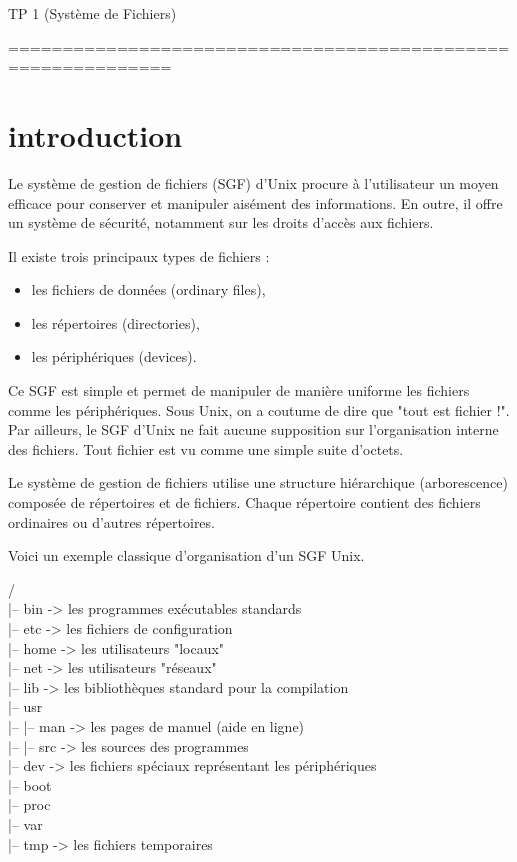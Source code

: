 \documentclass[10pt,a4paper]{article}
\begin{document}
\begin{center}
\huge{TP 1 (Système de Fichiers)}
\end{center}
=============================================================
\section{introduction}
Le système de gestion de fichiers (SGF) d'Unix procure à l'utilisateur un moyen efficace pour conserver et manipuler aisément des informations. En outre, il offre un système de sécurité, notamment sur les droits d'accès aux fichiers.


Il existe trois principaux types de fichiers :
\begin{itemize}
\item les fichiers de données (ordinary files),
\item les répertoires (directories),
\item les périphériques (devices).
\end{itemize}

Ce SGF est simple et permet de manipuler de manière uniforme les fichiers comme les périphériques. Sous Unix, on a coutume de dire que "tout est fichier !". Par ailleurs, le SGF d'Unix ne fait aucune
supposition sur l'organisation interne des fichiers. Tout fichier est vu comme une simple suite d'octets.


Le système de gestion de fichiers utilise une structure hiérarchique (arborescence) composée de répertoires et de fichiers. Chaque répertoire contient des fichiers ordinaires ou d'autres répertoires.

Voici un exemple classique d'organisation d'un SGF Unix.


/ \\
    |-- bin         -> les programmes exécutables standards \\
    |-- etc         -> les fichiers de configuration \\
    |-- home        -> les utilisateurs "locaux" \\
    |-- net         -> les utilisateurs "réseaux" \\
    |-- lib         -> les bibliothèques standard pour la compilation\\
    |-- usr         \\
    |-- |-- man     -> les pages de manuel (aide en ligne) \\
    |-- |-- src     -> les sources des programmes \\
    |-- dev         -> les fichiers spéciaux représentant les périphériques \\
    |-- boot        \\
    |-- proc        \\
    |-- var         \\
    |-- tmp         -> les fichiers temporaires \\
\end{document}
